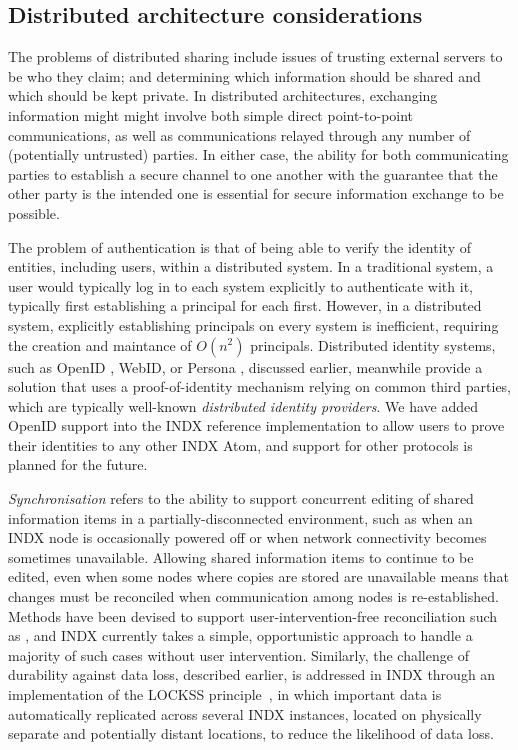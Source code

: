 \documentclass{sig-alternate}
\begin{document}
\subsection{Distributed architecture considerations}

The problems of distributed sharing include issues of trusting external servers to be who they claim; and determining which information should be shared and which should be kept private.  In distributed architectures, exchanging information might  might involve both simple direct point-to-point communications, as well as communications relayed through any number of (potentially untrusted) parties.  In either case, the ability for both communicating parties to establish a secure channel to one another with the guarantee that the other party is the intended one is essential for secure information exchange to be possible.

The problem of authentication is that of being able to verify the identity of entities, including users, within a distributed system. In a traditional system, a user would typically log in to each system explicitly to authenticate with it, typically first establishing a principal for each first.  However, in a distributed system, explicitly establishing principals on every system is inefficient, requiring the creation and maintance of $O(n^2)$ principals.  Distributed identity systems, such as OpenID \cite{recordon2006openid}, WebID\cite{huang2000webid}, or Persona \cite{koshutanski2007distributed}, discussed earlier, meanwhile provide a solution that uses a proof-of-identity mechanism relying on common third parties, which are typically well-known  \emph{distributed identity providers}. We have added OpenID support into the INDX reference implementation to allow users to prove their identities to any other INDX Atom, and support for other protocols is planned for the future.

\emph{Synchronisation} refers to the ability to support concurrent editing of shared information items in a partially-disconnected environment, such as when an INDX node is occasionally powered off or when network connectivity becomes sometimes unavailable.  Allowing shared information items to continue to be edited, even when some nodes where copies are stored are unavailable means that changes must be reconciled when communication among nodes is re-established.  Methods have been devised to support user-intervention-free reconciliation such as \cite{sun1998operational}, and INDX currently takes a simple, opportunistic approach to handle a majority of such cases without user intervention.  Similarly, the challenge of durability against data loss, described earlier, is addressed in INDX through an implementation of the LOCKSS principle~\cite{reich2001lockss}, in which important data is automatically replicated across several INDX instances, located on physically separate and potentially distant locations, to reduce the likelihood of data loss.
\end{document}
